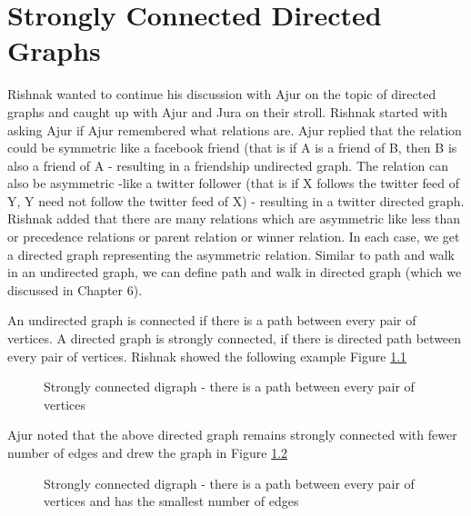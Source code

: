 \chapter{Strongly Connected Directed Graphs}
Rishnak wanted to continue his discussion with Ajur on the topic of directed graphs and caught up with Ajur and Jura on their stroll. Rishnak started with asking Ajur if Ajur remembered what relations are. Ajur replied that the relation could be symmetric like a facebook friend (that is if A is a friend of B, then B is also a friend of A - resulting in a friendship
undirected graph.
The relation can also be asymmetric -like a twitter follower (that is if X follows the twitter
feed of Y, Y need not follow the twitter feed of X) - resulting in a twitter directed graph.
Rishnak added that there are many relations which are asymmetric like less than or precedence relations or parent relation or winner relation. In each case, we get a directed graph representing the asymmetric relation.
Similar to path and walk in an undirected graph, we can define path and walk in directed graph (which we discussed in Chapter 6).

An undirected graph is connected if there is a path between every pair of vertices. A directed graph is strongly connected, if there is directed path between every pair of vertices. Rishnak showed the following example Figure \ref{15g1}

\begin{figure}
\begin{center}
\caption{ Strongly connected digraph - there is a path between every pair of vertices}\label{15g1}
\end{center}
\end{figure}

Ajur noted that the above directed graph remains strongly connected with fewer number of edges and  drew the graph in Figure \ref{15g2}

\begin{figure}
\begin{center}
\caption{ Strongly connected digraph - there is a path between every pair of vertices and has the smallest number of edges}\label{15g2}
\end{center}
\end{figure}

